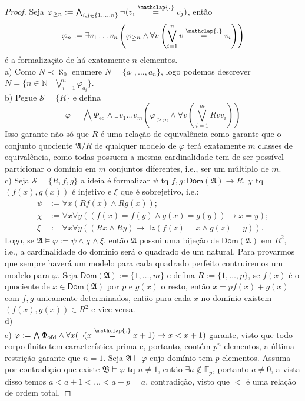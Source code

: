 \documentclass[11pt]{article}
\theoremstyle{definition}
\newcommand{\mc}[1]{\mathcal{#1}}
\newcommand{\mf}[1]{\mathfrak{#1}}
\newcommand{\msf}[1]{\mathsf{#1}}
\newcommand{\mbb}[1]{\mathbb{#1}}
\newcommand\overtext[2]{\stackrel{\mathclap{\normalfont\mbox{#1}}}{#2}}
\begin{document}
\begin{proof}
    Seja $\varphi_{\ge n}:=\bigwedge_{i,j\in\{1,\dots,n\}}\neg(v_i\overtext{.}{=}v_j)$, então $$\varphi_n:=\exists v_1\dots v_n\left(\varphi_{\ge n}\wedge\forall v\left(\bigvee_{i=1}^n v\overtext{.}{=} v_i\right)\right)$$ é a formalização de há exatamente $n$ elementos.\\
    a) Como $N\prec\aleph_0$ enumere $N=\{a_1,\dots,a_n\}$, logo podemos descrever $N=\bigl\{n\in\mbb{N}\mid\bigvee_{i=1}^n\varphi_{a_i}\bigr\}$.\\
    b) Pegue $\mc{S}=\{R\}$ e defina $$\varphi=\bigwedge\Phi_\text{eq}\wedge\exists v_1\dots v_m\left(\varphi_{\ge m}\wedge\forall v\left(\bigvee_{i=1}^mRvv_i\right)\right)$$
    Isso garante não só que $R$ é uma relação de equivalência como garante que o conjunto quociente $\mf{A}/R$ de qualquer modelo de $\varphi$ terá exatamente $m$ classes de equivalência, como todas possuem a mesma cardinalidade tem de ser possível particionar o domínio em $m$ conjuntos diferentes, i.e., ser um múltiplo de $m$.\\
    c) Seja $\mc{S}=\{R,f,g\}$ a ideia é formalizar $\psi$ tq $f,g:\msf{Dom}(\mf{A})\to R$, $\chi$ tq $(f(x),g(x))$ é injetivo e $\xi$ que é sobrejetivo, i.e.:
    \begin{align*}
        \psi & := \forall x(Rf(x)\wedge Rg(x));\\
        \chi & := \forall x\forall y((f(x)=f(y)\wedge g(x)=g(y))\rightarrow x=y);\\
        \xi & := \forall x\forall y((Rx\wedge Ry)\rightarrow\exists z(f(z)=x\wedge g(z)=y)).
    \end{align*}
    Logo, se $\mf{A}\vDash\varphi:=\psi\wedge\chi\wedge\xi$, então $\mf{A}$ possui uma bijeção de $\msf{Dom}(\mf{A})$ em $R^2$, i.e., a cardinalidade do domínio será o quadrado de um natural. Para provarmos que sempre haverá um modelo para cada quadrado perfeito contruiremos um modelo para $\varphi$. Seja $\msf{Dom}(\mf{A}):=\{1,\dots,m\}$ e defina $R:=\{1,\dots,p\}$, se $f(x)$ é o quociente de $x\in\msf{Dom}(\mf{A})$ por $p$ e $g(x)$ o resto, então $x=pf(x)+g(x)$ com $f,g$ unicamente determinados, então para cada $x$ no domínio existem $(f(x),g(x))\in R^2$ e vice versa.\\
    d) \\
    e) $\varphi:=\bigwedge\Phi_\text{ofd}\wedge\forall x(\neg(x\overtext{.}{=}x+1)\rightarrow x<x+1)$ garante, visto que todo corpo finito tem característica prima e, portanto, contém $p^n$ elementos, a última restrição garante que $n=1$. Seja $\mf{A}\vDash\varphi$ cujo domínio tem $p$ elementos. Assuma por contradição que existe $\mf{B}\vDash\varphi$ tq $n\ne1$, então $\exists a\notin\mbb{F}_p$, portanto $a\ne0$, a vista disso temos $a<a+1<\dots<a+p=a$, contradição, visto que $<$ é uma relação de ordem total.
\end{proof}
\end{document}
